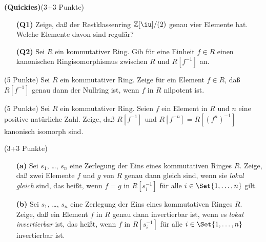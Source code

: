 \documentclass{algsheet}
\author{Dipl.-Math.~Franz Vogler}
\date{15.~Juni 2011}
\begin{document}
                \maketitle



\begin{exercise}\textbf{(Quickies)}(3+3 Punkte)\vspace{-1ex}
   \begin{itemize}
    \item [\textbf{(Q1)}]    Zeige, daß der Restklassenring \(\mathbb Z[\iu]/(2)\) genau vier Elemente hat.
    Welche Elemente davon sind regulär?
    \item [\textbf{(Q2)}]    Sei \(R\) ein kommutativer Ring. Gib für eine Einheit \(f \in R\) einen
    kanonischen Ringisomorphismus zwischen \(R\) und \(R[f^{-1}]\) an.
   \end{itemize}
\end{exercise}


\begin{exercise}(5 Punkte)\newline
    Sei \(R\) ein kommutativer Ring. Zeige für ein Element \(f \in R\), daß
    \(R[f^{-1}]\) genau dann der Nullring ist, wenn \(f\) in \(R\) nilpotent ist.
\end{exercise}

\begin{exercise}(5 Punkte)\newline
    Sei \(R\) ein kommutativer Ring. Seien \(f\) ein Element in \(R\) und
    \(n\) eine positive natürliche Zahl.
    Zeige, daß \(R[f^{-1}]\) und \(R[f^{-n}] = R[(f^n)^{-1}]\) kanonisch isomorph
    sind.
\end{exercise}

\begin{exercise}(3+3 Punkte)\vspace{-1ex}
     \begin{itemize}
    \item [\textbf{(a)}]    Sei \(s_1\), \dots, \(s_n\) eine Zerlegung der Eins eines kommutativen Ringes
    \(R\). Zeige, daß zwei Elemente \(f\) und \(g\) von \(R\) genau dann gleich
    sind, wenn sie \emph{lokal gleich} sind, das heißt, wenn
    \(f = g\) in \(R[s_i^{-1}]\) für alle \(i \in \Set{1, \dotsc, n}\) gilt.
  \item [\textbf{(b)}]    Sei \(s_1\), \dots, \(s_n\) eine Zerlegung der Eins eines kommutativen Ringes
    \(R\). Zeige, daß ein Element \(f\) in \(R\) genau dann invertierbar ist,
    wenn es \emph{lokal invertierbar} ist, das heißt, wenn
    \(f\) in \(R[s_i^{-1}]\) für alle \(i \in \Set{1, \dotsc, n}\) invertierbar 
    ist.
   \end{itemize}
\end{exercise}
\end{document}
